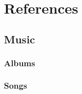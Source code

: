 \documentclass[2020/08/28 v2]{fanfic_book}
\begin{document}
\backmatter

\printEndnotes
\cleardoublepage\begin{sloppypar}
	\chapter{References}
	\printbibliography[heading=none,nottype=music]
	\section{Music}
	\nocite{MCR-bullets,MCR-three_cheers,MCR-black_parade,Evanescence-Fallen,GC-chronicles_life_death}
	\subsection{Albums}
	\printbibliography[heading=none,type=music,notsubtype=song]
	\subsection{Songs}
	\printbibliography[heading=none,subtype=song]
\end{sloppypar}
\end{document}
